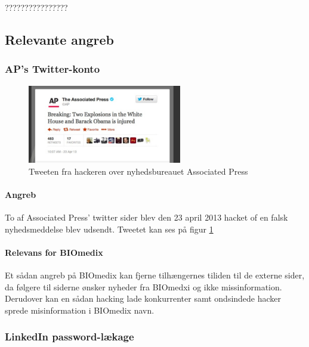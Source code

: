 \documentclass{article}
\begin{document}
????????????????

\subsection{Relevante angreb}

\subsubsection{AP's Twitter-konto}

\begin{figure}
  \begin{center}
    \includegraphics[width=0.6\textwidth]{../Pictures/APTweet.jpg}
  \end{center}
  \caption{Tweeten fra hackeren over nyhedsbureauet Associated Press \cite{APTweetSource}}
  \label{fig:Tweet}
\end{figure}

\paragraph{Angreb}

To af Associated Press' twitter sider blev den 23 april 2013 hacket of en falsk nyhedsmeddelse blev udsendt\cite{TweetStory}. Tweetet kan ses på figur \ref{fig:Tweet}

\paragraph{Relevans for BIOmedix}

Et sådan angreb på BIOmedix kan fjerne tilhængernes tiliden til de externe sider, da følgere til siderne
ønsker nyheder fra BIOmedxi og ikke missinformation. Derudover kan en sådan hacking lade konkurrenter
samt ondsindede hacker sprede misinformation i BIOmedix navn. 

\subsubsection{LinkedIn password-lækage}
\end{document}
